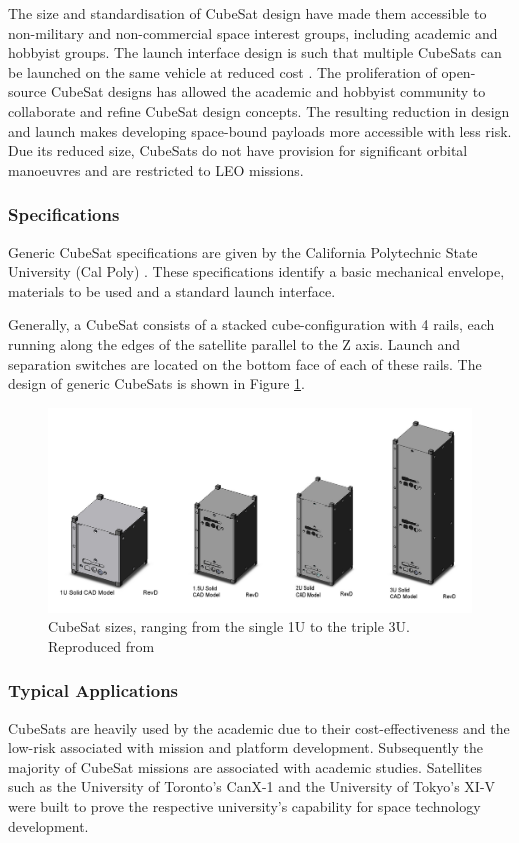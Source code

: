 The size and standardisation of CubeSat design have made them accessible to non-military and non-commercial space interest groups, including academic and hobbyist groups. The launch interface design is such that multiple CubeSats can be launched on the same vehicle at reduced cost \cite{Nason2002}. The proliferation of open-source CubeSat designs has allowed the academic and hobbyist community to collaborate and refine CubeSat design concepts. The resulting reduction in design and launch makes developing space-bound payloads more accessible with less risk. Due its reduced size, CubeSats do not have provision for significant orbital manoeuvres and are restricted to LEO missions. 

\subsubsection{Specifications}
Generic CubeSat specifications are given by the California Polytechnic State University (Cal Poly) \cite{Lee2011}. These specifications identify a basic mechanical envelope, materials to be used and a standard launch interface.

Generally, a CubeSat consists of a stacked cube-configuration with 4 rails, each running along the edges of the satellite parallel to the Z axis. Launch and separation switches are located on the bottom face of each of these rails. The design of generic CubeSats is shown in Figure \ref{fig:cubesat_sizes}.

\begin{figure}[htb]
	\centering
	\includegraphics[scale = 0.3]{Pictures/cubesat_sizes.png}
	
	\caption{CubeSat sizes, ranging from the single 1U to the triple 3U. Reproduced from \cite{CubeSatKit2013}}
	\label{fig:cubesat_sizes}
\end{figure}

\subsubsection{Typical Applications}
CubeSats are heavily used by the academic due to their cost-effectiveness and the low-risk associated with mission and platform development. Subsequently the majority of CubeSat missions are associated with academic studies. Satellites such as the University of Toronto's CanX-1 \cite{CanX-1} and the University of Tokyo's XI-V \cite{XI-V} were built to prove the respective university's capability for space technology development.

